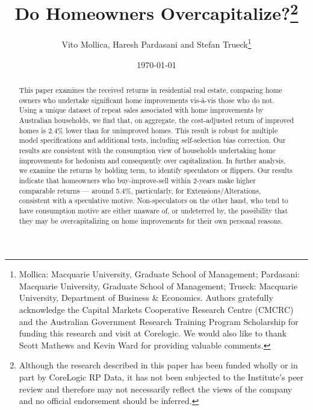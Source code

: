 \documentclass[AEJ,reqno, draftmode]{AEA} %
\begin{document}
\title{Do Homeowners Overcapitalize?\footnote{Although the research described in this paper has been funded wholly or in part by CoreLogic RP Data, it has not been subjected to the Institute's peer review and therefore may not necessarily reflect the views of the company and no official endorsement should be inferred.}}
\author{Vito Mollica, Haresh Pardasani and Stefan Trueck\thanks{%
Mollica: Macquarie University, Graduate School of Management; Pardasani: Macquarie University, Graduate School of Management; Trueck: Macquarie University, Department of Business \& Economics. Authors gratefully acknowledge the Capital Markets Cooperative Research Centre (CMCRC) and the Australian Government Research Training Program Scholarship for funding this research and visit at Corelogic. We would also like to thank Scott Mathews and Kevin Ward for providing valuable comments.}}
\date{\today}
\pubVolume{}
\pubIssue{}


\begin{abstract}
This paper examines the received returns in residential real estate, comparing home owners who undertake significant home improvements vis-à-vis those who do not. Using a unique dataset of repeat sales associated with home improvements by Australian households, we find that, on aggregate, the cost-adjusted return of improved homes is 2.4\% lower than for unimproved homes. This result is robust for multiple model specifications and additional tests, including self-selection bias correction. Our results are consistent with the consumption view of households undertaking home improvements for hedonism and consequently over capitalization. In further analysis, we examine the returns by holding term, to identify speculators or flippers. Our results indicate that homeowners who buy-improve-sell within 2-years make higher comparable returns --- around 5.4\%, particularly, for Extensions/Alterations, consistent with a speculative motive. Non-speculators on the other hand, who tend to have consumption motive are either unaware of, or undeterred by, the possibility that they may be overcapitalizing on home improvements for their own personal reasons.

\end{abstract}
\end{document}
